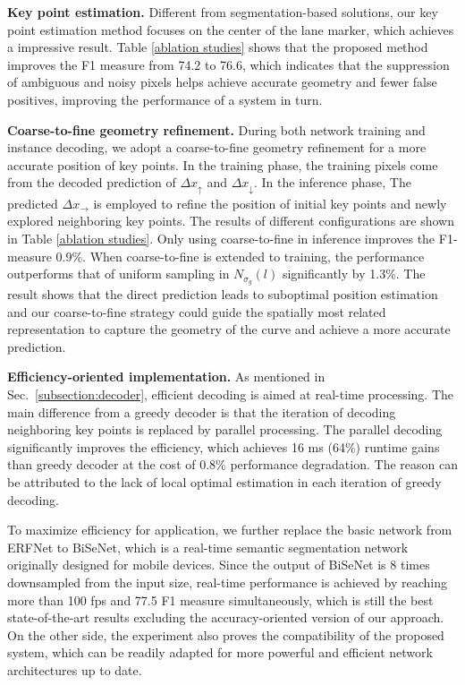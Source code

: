 \documentclass[final]{cvpr}
\begin{document}
\textbf{Key point estimation.} Different from segmentation-based solutions, our key point estimation method focuses on the center of the lane marker, which achieves a impressive result. Table \ref{ablation studies} shows that the proposed method improves the F1 measure from 74.2 to 76.6, which indicates that the suppression of ambiguous and noisy pixels helps achieve accurate geometry and fewer false positives, improving the performance of a system in turn.

\textbf{Coarse-to-fine geometry refinement.} During both network training and instance decoding, we adopt a coarse-to-fine geometry refinement for a more accurate position of key points. In the training phase, the training pixels come from the decoded prediction of $\Delta{x_{\uparrow}}$ and $\Delta{x_{\downarrow}}$. In the inference phase, The predicted $\Delta{x_{\rightarrow}}$ is employed to refine the position of initial key points and newly explored neighboring key points. The results of different configurations are shown in Table \ref{ablation studies}. Only using coarse-to-fine in inference improves the F1-measure 0.9\%. When coarse-to-fine is extended to training, the performance outperforms that of uniform sampling in $N_{\sigma_{g}}(l)$ significantly by 1.3\%. The result shows that the direct prediction leads to suboptimal position estimation and our coarse-to-fine strategy could guide the spatially most related representation to capture the geometry of the curve and achieve a more accurate prediction.

\textbf{Efficiency-oriented implementation.} As mentioned in  Sec.~\ref{subsection:decoder}, efficient decoding is aimed at real-time processing. The main difference from a greedy decoder is that the iteration of decoding neighboring key points is replaced by parallel processing. The parallel decoding significantly improves the efficiency, which achieves 16 ms (64\%) runtime gains than greedy decoder at the cost of 0.8\% performance degradation. The reason can be attributed to the lack of local optimal estimation in each iteration of greedy decoding. 

To maximize efficiency for application, we further replace the basic network from ERFNet to BiSeNet, which is a real-time semantic segmentation network originally designed for mobile devices. Since the output of BiSeNet is 8 times downsampled from the input size, real-time performance is achieved by reaching  more than 100 fps and 77.5 F1 measure simultaneously, which is still the best state-of-the-art results excluding the accuracy-oriented version of our approach. On the other side, the experiment also proves the compatibility of the proposed system, which can be readily adapted for more powerful and efficient network architectures up to date.
\end{document}
